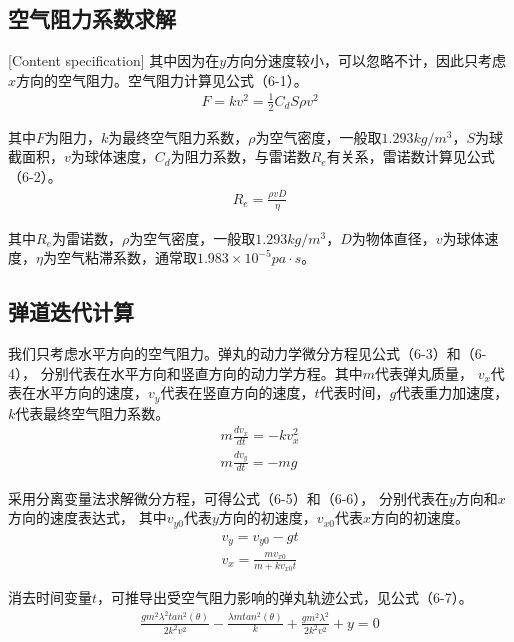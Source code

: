 \subsection{空气阻力系数求解}[Content specification]
其中因为在$y$⽅向分速度较⼩，可以忽略不计，因此只考虑$x$⽅向的空⽓阻⼒。空气阻力计算见公式（6-1）。
\begin{gather}
    F = kv^2 =  \frac{1}{2} C_dS \rho  v^2
\end{gather}

\par

其中$F$为阻力，$k$为最终空气阻力系数，$\rho$为空气密度，一般取$1.293kg/m^3$，$S$为球截面积，$v$为球体速度，$C_d$为阻力系数，与雷诺数$R_e$有关系，雷诺数计算见公式（6-2）。
\begin{gather}
    R_e = \frac{\rho v D}{\eta}
\end{gather}

其中$R_e$为雷诺数，$\rho$为空气密度，一般取$1.293kg/m^3$，$D$为物体直径，$v$为球体速度，$\eta$为空气粘滞系数，通常取$1.983\times10^{-5}pa\cdot s$。 


\subsection{弹道迭代计算}

我们只考虑水平方向的空气阻力。弹丸的动力学微分方程见公式（6-3）和（6-4），
分别代表在水平方向和竖直方向的动力学方程。其中$m$代表弹丸质量，
$v_x$代表在水平方向的速度，$v_y$代表在竖直方向的速度，$t$代表时间，$g$代表重力加速度，$k$代表最终空气阻力系数。
\begin{gather}
    m \frac{dv_x}{dt} = -k v_x^2 \\
    m \frac{dv_y}{dt} = -mg
\end{gather} 

采用分离变量法求解微分方程，可得公式（6-5）和（6-6），
分别代表在$y$方向和$x$方向的速度表达式，
其中$v_{y0}$代表$y$方向的初速度，$v_{x0}$代表$x$方向的初速度。
\begin{gather}
    v_y = v_{y0}-gt \\
    v_x = \frac{m v_{x0}}{m+kv_{x0}t}
\end{gather}

消去时间变量$t$，可推导出受空气阻力影响的弹丸轨迹公式，见公式（6-7）。
\begin{gather}
\frac{gm^2\lambda^2 tan^2(\theta)}{2k^2v^2}-\frac{\lambda m tan^2(\theta)}{k}+\frac{gm^2\lambda^2}{2k^2v^2}+y = 0
\end{gather}

